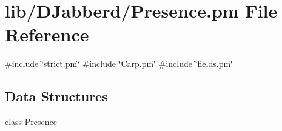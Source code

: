 \hypertarget{_presence_8pm}{
\section{lib/\-D\-Jabberd/\-Presence.pm \-File \-Reference}
\label{_presence_8pm}
}
{\ttfamily \#include \char`\"{}strict.\-pm\char`\"{}}\*
{\ttfamily \#include \char`\"{}\-Carp.\-pm\char`\"{}}\*
{\ttfamily \#include \char`\"{}fields.\-pm\char`\"{}}\*
\subsection*{\-Data \-Structures}
\begin{DoxyCompactItemize}
\item 
class \hyperlink{class_d_jabberd_1_1_presence}{\-Presence}
\end{DoxyCompactItemize}
